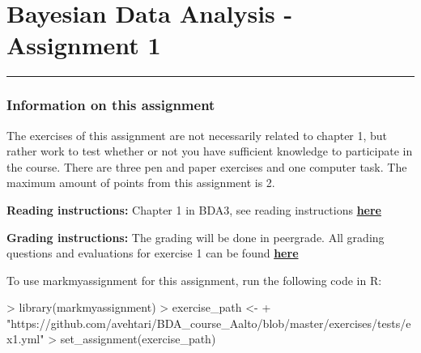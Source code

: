 \documentclass[11pt,a4paper,english]{article}
\newcommand{\HRule}{\rule{\linewidth}{0.5mm}}
\begin{document}


\section*{Bayesian Data Analysis - Assignment 1}


\HRule





\subsubsection*{Information on this assignment}

The exercises of this assignment are not necessarily related to chapter 1, but rather work to test whether or not you have sufficient knowledge to participate in the course. There are three pen and paper exercises and one computer task. The maximum amount of points from this assignment is 2. 

\textbf{Reading instructions:} Chapter 1 in BDA3, see reading instructions \href{https://github.com/avehtari/BDA_course_Aalto/blob/master/chapter_notes/BDA_notes_ch1.pdf}{\textbf{here}}

\textbf{Grading instructions:} The grading will be done in peergrade. All grading questions and evaluations for exercise 1 can be found \href{https://github.com/avehtari/BDA_course_Aalto/blob/master/exercises/ex1_rubric.md}{\textbf{here}}

To use markmyassignment for this assignment, run the following code in R:
\begin{Schunk}
\begin{Sinput}
> library(markmyassignment)
> exercise_path <- 
+   "https://github.com/avehtari/BDA_course_Aalto/blob/master/exercises/tests/ex1.yml"
> set_assignment(exercise_path)
\end{Sinput}
\end{Schunk}


\end{document}
